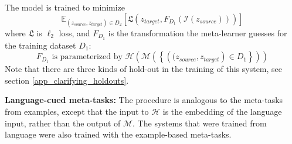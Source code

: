 The model is trained to minimize
\[\mathbb{E}_{(z_{source}, z_{target})\in {D}_2} \left[ \mathfrak{L}\left(z_{target}, F_{D_1}\left(\mathcal{I} \left(z_{source}\right)\right) \right)\right]\]
where $\mathfrak{L}$ is $\ell_2$ loss, and $F_{D_1}$ is the transformation the meta-learner guesses for the training dataset $D_1$:
\[F_{D_1} \text{ is parameterized by } \mathcal{H}\left(\mathcal{M}\left( \left\{\left((z_{source},z_{target}\right) \in D_1 \right\}\right)\right)\]
Note that there are three kinds of hold-out in the training of this system, see section \ref{app_clarifying_holdouts}. \par
\textbf{Language-cued meta-tasks:} The procedure is analogous to the meta-tasks from examples, except that the input to $\mathcal{H}$ is the embedding of the language input, rather than the output of $\mathcal{M}$. The systems that were trained from language were also trained with the example-based meta-tasks.\par



